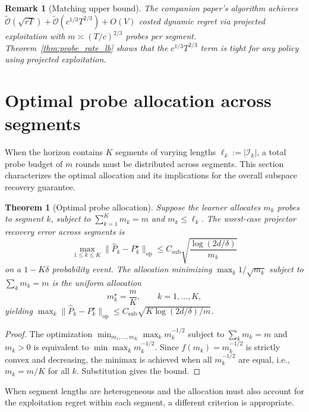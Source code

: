 \documentclass[12pt]{article}
\newcommand{\op}{\mathrm{op}}
\newcommand{\cI}{\mathcal{I}}
\newcommand{\tilO}{\widetilde{\mathcal{O}}}
\newtheorem{theorem}{Theorem}
\newtheorem{remark}{Remark}
\theoremstyle{plain}
\theoremstyle{definition}
\begin{document}
\begin{remark}[Matching upper bound]
The companion paper's algorithm achieves $\tilO(\sqrt{rT}) + \tilO(c^{1/3}T^{2/3}) + O(V)$ costed dynamic regret via projected exploitation with $m \asymp (T/c)^{2/3}$ probes per segment. Theorem~\ref{thm:probe_rate_lb} shows that the $c^{1/3}T^{2/3}$ term is tight for any policy using projected exploitation.
\end{remark}


\section{Optimal probe allocation across segments}
\label{sec:probe_allocation}

When the horizon contains $K$ segments of varying lengths $\ell_k := |\cI_k|$, a total probe budget of $m$ rounds must be distributed across segments. This section characterizes the optimal allocation and its implications for the overall subspace recovery guarantee.

\begin{theorem}[Optimal probe allocation]
\label{thm:optimal_allocation}
Suppose the learner allocates $m_k$ probes to segment $k$, subject to $\sum_{k=1}^K m_k = m$ and $m_k \le \ell_k$. The worst-case projector recovery error across segments is
\[
\max_{1 \le k \le K} \|\widehat{P}_k - P_k^\star\|_{\op} \le C_{\mathrm{sub}} \sqrt{\frac{\log(2d/\delta)}{m_k}}
\]
on a $1-K\delta$ probability event. The allocation minimizing $\max_k 1/\sqrt{m_k}$ subject to $\sum_k m_k = m$ is the \emph{uniform allocation}
\[
m_k^\star = \frac{m}{K}, \qquad k = 1, \ldots, K,
\]
yielding $\max_k \|\widehat{P}_k - P_k^\star\|_{\op} \le C_{\mathrm{sub}}\sqrt{K\log(2d/\delta) / m}$.
\end{theorem}

\begin{proof}
The optimization $\min_{m_1, \ldots, m_K} \max_k m_k^{-1/2}$ subject to $\sum_k m_k = m$ and $m_k > 0$ is equivalent to $\min \max_k m_k^{-1/2}$. Since $f(m_k) = m_k^{-1/2}$ is strictly convex and decreasing, the minimax is achieved when all $m_k^{-1/2}$ are equal, i.e., $m_k = m/K$ for all $k$. Substitution gives the bound.
\end{proof}

When segment lengths are heterogeneous and the allocation must also account for the exploitation regret within each segment, a different criterion is appropriate.
\end{document}
